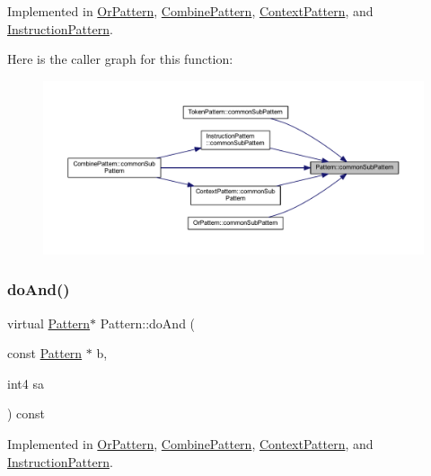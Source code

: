 Implemented in \mbox{\hyperlink{class_or_pattern_a298d0540c485a3e056410848a4870c92}{Or\+Pattern}}, \mbox{\hyperlink{class_combine_pattern_a161632a4352aed9b12d9a7497d8af681}{Combine\+Pattern}}, \mbox{\hyperlink{class_context_pattern_a6fb24df62ecafb88fb1a41e8b710ab62}{Context\+Pattern}}, and \mbox{\hyperlink{class_instruction_pattern_a22b45bc904929f0f094a0a64174bb70c}{Instruction\+Pattern}}.

Here is the caller graph for this function\+:
\nopagebreak
\begin{figure}[H]
\begin{center}
\leavevmode
\includegraphics[width=350pt]{class_pattern_a54daed6fc84146ad309a25dfa8a68052_icgraph}
\end{center}
\end{figure}
\mbox{\label{class_pattern_a960f3e000e2642c452fe11f5b55a9589}} 
\subsubsection{\texorpdfstring{doAnd()}{doAnd()}}
{\footnotesize\ttfamily virtual \mbox{\hyperlink{class_pattern}{Pattern}}$\ast$ Pattern\+::do\+And (\begin{DoxyParamCaption}\item[{const \mbox{\hyperlink{class_pattern}{Pattern}} $\ast$}]{b,  }\item[{int4}]{sa }\end{DoxyParamCaption}) const\hspace{0.3cm}{\ttfamily [pure virtual]}}



Implemented in \mbox{\hyperlink{class_or_pattern_a8375a0c2a661775d1211535540d68d3c}{Or\+Pattern}}, \mbox{\hyperlink{class_combine_pattern_aaa5045424b76fd037a192fb4654c7ed8}{Combine\+Pattern}}, \mbox{\hyperlink{class_context_pattern_acffa2b64552acaf8824b2093119f9eca}{Context\+Pattern}}, and \mbox{\hyperlink{class_instruction_pattern_ac56875a4e5fca7c5a3ea2a92a3afc47b}{Instruction\+Pattern}}.

